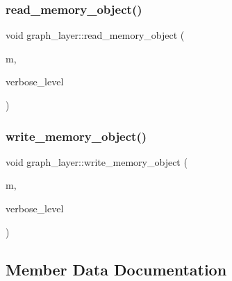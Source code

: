 \mbox{\label{classgraph__layer_aed94444b08a552c31e8b887c04a33b7f}} 
\subsubsection{\texorpdfstring{read\+\_\+memory\+\_\+object()}{read\_memory\_object()}}
{\footnotesize\ttfamily void graph\+\_\+layer\+::read\+\_\+memory\+\_\+object (\begin{DoxyParamCaption}\item[{\mbox{\hyperlink{classmemory__object}{memory\+\_\+object}} $\ast$}]{m,  }\item[{\mbox{\hyperlink{galois_8h_a09fddde158a3a20bd2dcadb609de11dc}{I\+NT}}}]{verbose\+\_\+level }\end{DoxyParamCaption})}

\mbox{\label{classgraph__layer_ac04a5403f452bec70405cec8a75ee6e7}} 
\subsubsection{\texorpdfstring{write\+\_\+memory\+\_\+object()}{write\_memory\_object()}}
{\footnotesize\ttfamily void graph\+\_\+layer\+::write\+\_\+memory\+\_\+object (\begin{DoxyParamCaption}\item[{\mbox{\hyperlink{classmemory__object}{memory\+\_\+object}} $\ast$}]{m,  }\item[{\mbox{\hyperlink{galois_8h_a09fddde158a3a20bd2dcadb609de11dc}{I\+NT}}}]{verbose\+\_\+level }\end{DoxyParamCaption})}



\subsection{Member Data Documentation}
\mbox{\label{classgraph__layer_a8fdef3e79a5c98d05bcafaed5b41e11b}} 
